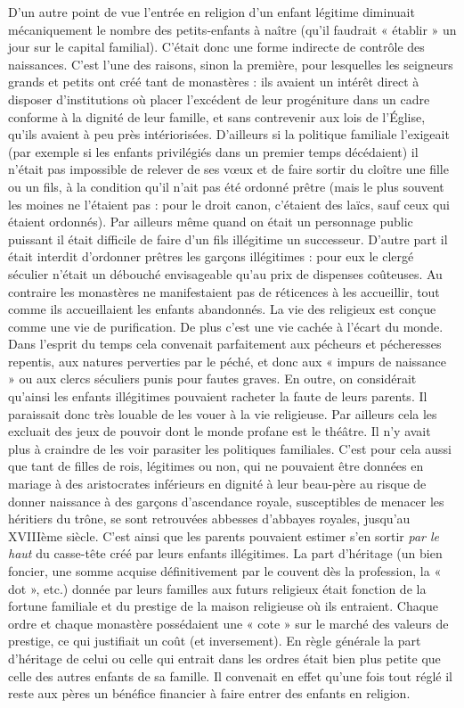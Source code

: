  D'un autre point de vue l'entrée en religion d'un enfant légitime diminuait mécaniquement le nombre des petits-enfants à naître (qu'il faudrait « établir » un jour sur le capital familial). C'était donc une forme indirecte de contrôle des naissances. C'est l'une des raisons, sinon la première, pour lesquelles les seigneurs grands et petits ont créé tant de monastères : ils avaient un intérêt direct à disposer d'institutions où placer l'excédent de leur progéniture dans un cadre conforme à la dignité de leur famille, et sans contrevenir aux lois de l'Église, qu'ils avaient à peu près intériorisées. D'ailleurs si la politique familiale l'exigeait (par exemple si les enfants privilégiés dans un premier temps décédaient) il n'était pas impossible de relever de ses vœux et de faire sortir du cloître une fille ou un fils, à la condition qu'il n'ait pas été ordonné prêtre (mais le plus souvent les moines ne l'étaient pas : pour le droit canon, c'étaient des laïcs, sauf ceux qui étaient ordonnés).
 Par ailleurs même quand on était un personnage public puissant il était difficile de faire d'un fils illégitime un successeur. D'autre part il était interdit d'ordonner prêtres les garçons illégitimes : pour eux le clergé séculier n'était un débouché envisageable qu'au prix de dispenses coûteuses. Au contraire les monastères ne manifestaient pas de réticences à les accueillir, tout comme ils accueillaient les enfants abandonnés. La vie des religieux est conçue comme une vie de purification. De plus c'est une vie cachée à l'écart du monde. Dans l'esprit du temps cela convenait parfaitement aux pécheurs et pécheresses repentis, aux natures perverties par le péché, et donc aux « impurs de naissance » ou aux clercs séculiers punis pour fautes graves. En outre, on considérait qu'ainsi les enfants illégitimes pouvaient racheter la faute de leurs parents. Il paraissait donc très louable de les vouer à la vie religieuse. Par ailleurs cela les excluait des jeux de pouvoir dont le monde profane est le théâtre. Il n'y avait plus à craindre de les voir parasiter les politiques familiales. C'est pour cela aussi que tant de filles de rois, légitimes ou non, qui ne pouvaient être données en mariage à des aristocrates inférieurs en dignité à leur beau-père au risque de donner naissance à des garçons d'ascendance royale, susceptibles de menacer les héritiers du trône, se sont retrouvées abbesses d'abbayes royales, jusqu'au XVIIIème siècle. C'est ainsi que les parents pouvaient estimer s'en sortir \emph{par le haut} du casse-tête créé par leurs enfants illégitimes.
 La part d'héritage (un bien foncier, une somme acquise définitivement par le couvent dès la profession, la « dot », etc.) donnée par leurs familles aux futurs religieux était fonction de la fortune familiale et du prestige de la maison religieuse où ils entraient. Chaque ordre et chaque monastère possédaient une « cote » sur le marché des valeurs de prestige, ce qui justifiait un coût (et inversement). En règle générale la part d'héritage de celui ou celle qui entrait dans les ordres était bien plus petite que celle des autres enfants de sa famille. Il convenait en effet qu'une fois tout réglé il reste aux pères un bénéfice financier à faire entrer des enfants en religion. 
